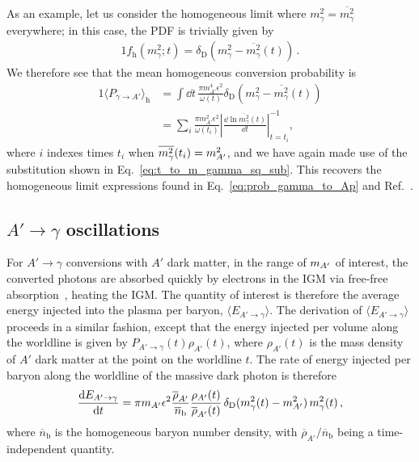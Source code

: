 \documentclass[prd,aps,10pt,nofootinbib,twocolumn,superscriptaddress,preprintnumbers,balancelastpage,longbibliography]{revtex4-1}
\begin{document}
As an example, let us consider the homogeneous limit where $m_\gamma^2 = \overline{m_\gamma^2}$ everywhere; in this case, the PDF is trivially given by
%
\begin{alignat}{1}
    f_\text{h}(m_\gamma^2;t) = \delta_\text{D}(m_\gamma^2 - \overline{m_\gamma^2}(t)) \,.
    \label{eq:f_homo_limit}
\end{alignat}
%
We therefore see that the mean homogeneous conversion probability is
%
\begin{alignat}{1}
    \langle P_{\gamma \to A'} \rangle_\text{h} &= \int \dd t \, \frac{\pi m_{A'}^4 \epsilon^2}{\omega(t)} \delta_\text{D}(m_\gamma^2 - \overline{m_\gamma^2}(t)) \nonumber \\
    &= \sum_i \frac{\pi m_{A'}^2 \epsilon^2}{\omega(t_i)} \left| \frac{\dd \ln \overline{m_\gamma^2}(t)}{\dd t} \right|^{-1}_{t=t_i} \!\!\!,
\end{alignat}
%
where $i$ indexes times $t_i$ when $\overline{m_\gamma^2}(t_i) = m_{A^\prime}^2$, and we have again made use of the substitution shown in Eq.~\eqref{eq:t_to_m_gamma_sq_sub}. This recovers the homogeneous limit expressions found in Eq.~\eqref{eq:prob_gamma_to_Ap} and Ref.~\cite{Mirizzi:2009iz}.

\subsection{\texorpdfstring{$A' \to \gamma$ oscillations}{Dark photon-photon oscillations}}


For $A' \to \gamma$ conversions with $A'$ dark matter, in the range of $m_{A^\prime}$ of interest, the converted photons are absorbed quickly by electrons in the IGM via free-free absorption~\cite{McDermott:2019lch}, heating the IGM\@. 
The quantity of interest is therefore the average energy injected into the plasma per baryon, $\langle E_{A' \to \gamma} \rangle$. The derivation of $\langle E_{A' \to \gamma}\rangle$ proceeds in a similar fashion, except that the energy injected per volume along the worldline is given by $P_{A' \to \gamma}(t) \rho_{A'}(t)$, where $\rho_{A'}(t)$ is the mass density of $A'$ dark matter at the point on the worldline $t$. 
The rate of energy injected per baryon along the worldline of the massive dark photon is therefore
%
\begin{alignat}{1}
    \frac{\mathrm{d} E_{A' \to \gamma}}{\mathrm{d} t} = \pi m_{A'} \epsilon^2 \frac{\overline{\rho}_{A'}}{\overline{n}_\text{b}} \frac{\rho_{A'}(t)}{\overline{\rho}_{A'}(t)} \, \delta_\text{D}(m_\gamma^2(t) - m_{A^\prime}^2)\, m_\gamma^2(t) \,,
\end{alignat}
%
where $\overline{n}_\text{b}$ is the homogeneous baryon number density, with $\overline{\rho}_{A'}/\overline{n}_\text{b}$ being a time-independent quantity. 
\end{document}
